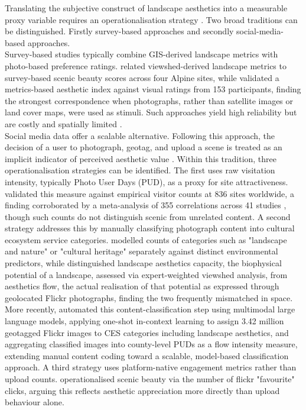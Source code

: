 \documentclass[hidelinks, 11pt]{article}
\begin{document}
Translating the subjective construct of landscape aesthetics into a measurable proxy variable requires an operationalisation strategy \citep{daniel_whither_2001}. Two broad traditions can be distinguished. Firstly survey-based approaches and secondly social-media-based approaches.
\\
Survey-based studies typically combine GIS-derived landscape metrics with photo-based preference ratings. \citep{schirpke_predicting_2013} related viewshed-derived landscape metrics to survey-based scenic beauty scores across four Alpine sites, while \citep{frank_assessment_2013} validated a metrics-based aesthetic index against visual ratings from 153 participants, finding the strongest correspondence when photographs, rather than satellite images or land cover maps, were used as stimuli. Such approaches yield high reliability but are costly and spatially limited \citep{schirpke_predicting_2013}.
\\
Social media data offer a scalable alternative. Following this approach, the decision of a user to photograph, geotag, and upload a scene is treated as an implicit indicator of perceived aesthetic value \citep{langemeyer_mapping_2018}. Within this tradition, three operationalisation strategies can be identified. The first uses raw visitation intensity, typically Photo User Days (PUD), as a proxy for site attractiveness. \citep{wood_using_2013} validated this measure against empirical visitor counts at 836 sites worldwide, a finding corroborated by a meta-analysis of 355 correlations across 41 studies \citep{ghermandi_geolocated_2022}, though such counts do not distinguish scenic from unrelated content. A second strategy addresses this by manually classifying photograph content into cultural ecosystem service categories. \citep{vaz_digital_2020} modelled counts of categories such as "landscape and nature" or "cultural heritage" separately against distinct environmental predictors, while \citep{langemeyer_mapping_2018} distinguished landscape aesthetics capacity, the biophysical potential of a landscape, assessed via expert-weighted viewshed analysis, from aesthetics flow, the actual realisation of that potential as expressed through geolocated Flickr photographs, finding the two frequently mismatched in space. More recently, \citep{liao_oneshot_2025} automated this content-classification step using multimodal large language models, applying one-shot in-context learning to assign 3.42 million geotagged Flickr images to CES categories including landscape aesthetics, and aggregating classified images into county-level PUDs as a flow intensity measure, extending manual content coding toward a scalable, model-based classification approach. A third strategy uses platform-native engagement metrics rather than upload counts. \citep{despotovic_beautiful_2025} operationalised scenic beauty via the number of flickr "favourite" clicks, arguing this reflects aesthetic appreciation more directly than upload behaviour alone.
\end{document}
